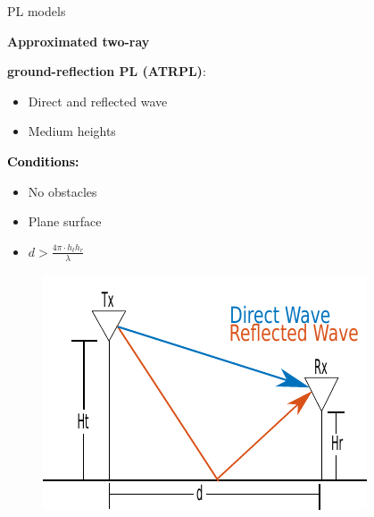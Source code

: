 \documentclass[10pt]{beamer}
\begin{document}
\begin{frame}{PL models}
\begin{minipage}{.45\textwidth}
\raggedright\textcolor{thomasred}{\textbf{Approximated two-ray}}\\
\raggedright\textcolor{thomasred}{\textbf{ground-reflection PL (ATRPL)}:}
\begin{itemize}
\item Direct and reflected wave
\item Medium heights
\end{itemize} 

\vspace{1em}
\textcolor{black}{\textbf{Conditions:}}
\begin{itemize}
\item No obstacles
\item Plane surface
\item $d > \frac{4\pi \cdot h_t h_r }{\lambda}$
\end{itemize}

\end{minipage}
\begin{minipage}{0.5\textwidth}
\begin{figure}[!htbp]
 \centering
  \includegraphics[width = \columnwidth]{figures/two_ray_illu.pdf}
  \end{figure}
\end{minipage}
\end{frame}
\end{document}

